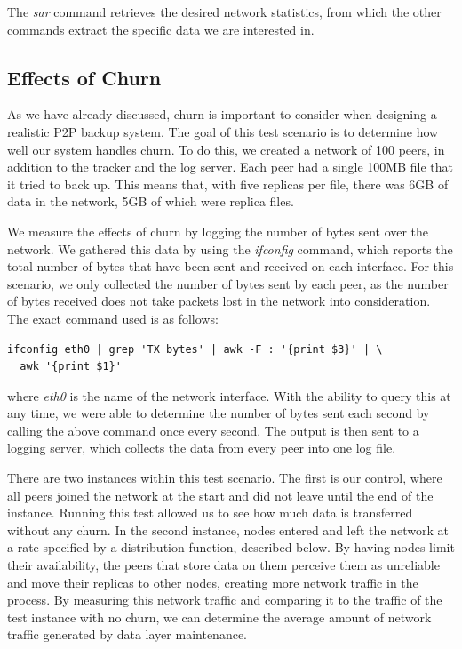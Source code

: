 \documentclass[12pt]{report}
\begin{document}
The \textit{sar} command retrieves the desired network statistics, from which the other commands extract the specific data we are interested in.

\subsection{Effects of Churn} \label{subsec:EffectsofChurn_sec:TestScenarios_chap:Methodology}

As we have already discussed, churn is important to consider when designing a realistic P2P backup system. The goal of this test scenario is to determine how well our system handles churn. To do this, we created a network of 100 peers, in addition to the tracker and the log server. Each peer had a single 100MB file that it tried to back up. This means that, with five replicas per file, there was 6GB of data in the network, 5GB of which were replica files.

We measure the effects of churn by logging the number of bytes sent over the network. We gathered this data by using the \textit{ifconfig} command, which reports the total number of bytes that have been sent and received on each interface. For this scenario, we only collected the number of bytes sent by each peer, as the number of bytes received does not take packets lost in the network into consideration. The exact command used is as follows:

\begin{verbatim}
ifconfig eth0 | grep 'TX bytes' | awk -F : '{print $3}' | \
  awk '{print $1}'
\end{verbatim}

where \textit{eth0} is the name of the network interface. With the ability to query this at any time, we were able to determine the number of bytes sent each second by calling the above command once every second. The output is then sent to a logging server, which collects the data from every peer into one log file.

There are two instances within this test scenario. The first is our control, where all peers joined the network at the start and did not leave until the end of the instance. Running this test allowed us to see how much data is transferred without any churn. In the second instance, nodes entered and left the network at a rate specified by a distribution function, described below. By having nodes limit their availability, the peers that store data on them perceive them as unreliable and move their replicas to other nodes, creating more network traffic in the process. By measuring this network traffic and comparing it to the traffic of the test instance with no churn, we can determine the average amount of network traffic generated by data layer maintenance.
\end{document}
